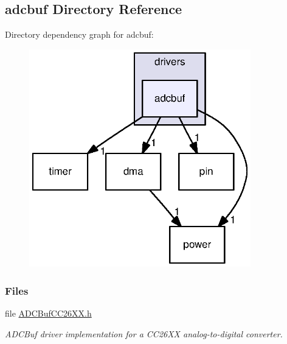 \subsection{adcbuf Directory Reference}
\label{dir_412e8b5d6a560d122277a53c39cfebbd}
Directory dependency graph for adcbuf\+:
\nopagebreak
\begin{figure}[H]
\begin{center}
\leavevmode
\includegraphics[width=273pt]{dir_412e8b5d6a560d122277a53c39cfebbd_dep}
\end{center}
\end{figure}
\subsubsection*{Files}
\begin{DoxyCompactItemize}
\item 
file \hyperlink{_a_d_c_buf_c_c26_x_x_8h}{A\+D\+C\+Buf\+C\+C26\+X\+X.\+h}
\begin{DoxyCompactList}\small\item\em A\+D\+C\+Buf driver implementation for a C\+C26\+X\+X analog-\/to-\/digital converter. \end{DoxyCompactList}\end{DoxyCompactItemize}
